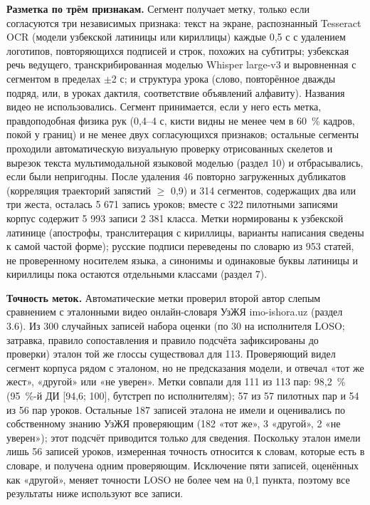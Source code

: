 \documentclass[a4paper,fleqn]{cas-dc}
\begin{document}
\textbf{Разметка по трём признакам.} Сегмент получает метку, только если согласуются три независимых признака: текст на экране, распознанный Tesseract OCR \cite{2007_smith_tesseract} (модели узбекской латиницы или кириллицы) каждые 0,5 с с удалением логотипов, повторяющихся подписей и строк, похожих на субтитры; узбекская речь ведущего, транскрибированная моделью Whisper large-v3 \cite{2023_radford_whisper} и выровненная с сегментом в пределах $\pm$2 с; и структура урока (слово, повторённое дважды подряд, или, в уроках дактиля, соответствие объявлений алфавиту). Названия видео не использовались. Сегмент принимается, если у него есть метка, правдоподобная физика рук (0,4--4 с, кисти видны не менее чем в 60~\% кадров, покой у границ) и не менее двух согласующихся признаков; остальные сегменты проходили автоматическую визуальную проверку отрисованных скелетов и вырезок текста мультимодальной языковой моделью (раздел 10) и отбрасывались, если были непригодны. После удаления 46 повторно загруженных дубликатов (корреляция траекторий запястий $\geq$ 0,9) и 314 сегментов, содержащих два или три жеста, осталась 5 671 запись уроков; вместе с 322 пилотными записями корпус содержит 5 993 записи 2 381 класса. Метки нормированы к узбекской латинице (апострофы, транслитерация с кириллицы, варианты написания сведены к самой частой форме); русские подписи переведены по словарю из 953 статей, не проверенному носителем языка, а синонимы и одинаковые буквы латиницы и кириллицы пока остаются отдельными классами (раздел 7).

\textbf{Точность меток.} Автоматические метки проверил второй автор слепым сравнением с эталонными видео онлайн-словаря УзЖЯ imo-ishora.uz (раздел 3.6). Из 300 случайных записей набора оценки (по 30 на исполнителя LOSO; затравка, правило сопоставления и правило подсчёта зафиксированы до проверки) эталон той же глоссы существовал для 113. Проверяющий видел сегмент корпуса рядом с эталоном, но не предсказания модели, и отвечал «тот же жест», «другой» или «не уверен». Метки совпали для 111 из 113 пар: 98,2~\% (95~\%-й ДИ {[}94,6; 100{]}, бутстреп по исполнителям); 57 из 57 пилотных пар и 54 из 56 пар уроков. Остальные 187 записей эталона не имели и оценивались по собственному знанию УзЖЯ проверяющим (182 «тот же», 3 «другой», 2 «не уверен»); этот подсчёт приводится только для сведения. Поскольку эталон имели лишь 56 записей уроков, измеренная точность относится к словам, которые есть в словаре, и получена одним проверяющим. Исключение пяти записей, оценённых как «другой», меняет точности LOSO не более чем на 0,1 пункта, поэтому все результаты ниже используют все записи.
\end{document}
